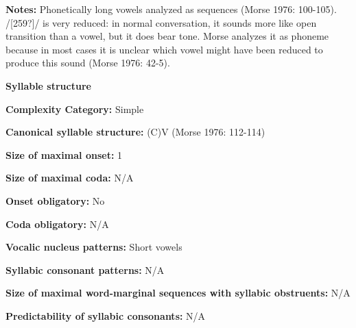 \begin{styleBody}
\textbf{Notes: }Phonetically long vowels analyzed as sequences (Morse 1976: 100-105). /[259?]/ is very reduced: in normal conversation, it sounds more like open transition than a vowel, but it does bear tone. Morse analyzes it as phoneme because in most cases it is unclear which vowel might have been reduced to produce this sound (Morse 1976: 42-5).
\end{styleBody}

\begin{styleBody}
\textbf{Syllable structure}
\end{styleBody}

\begin{styleBody}
\textbf{Complexity Category:} Simple
\end{styleBody}

\begin{styleBody}
\textbf{Canonical syllable structure:} (C)V\textbf{ }(Morse 1976: 112-114)
\end{styleBody}

\begin{styleBody}
\textbf{Size of maximal onset:} 1
\end{styleBody}

\begin{styleBody}
\textbf{Size of maximal coda:} N/A
\end{styleBody}

\begin{styleBody}
\textbf{Onset obligatory:} No
\end{styleBody}

\begin{styleBody}
\textbf{Coda obligatory:} N/A
\end{styleBody}

\begin{styleBody}
\textbf{Vocalic nucleus patterns:} Short vowels
\end{styleBody}

\begin{styleBody}
\textbf{Syllabic consonant patterns:} N/A
\end{styleBody}

\begin{styleBody}
\textbf{Size of maximal word{}-marginal sequences with syllabic obstruents:} N/A
\end{styleBody}

\begin{styleBody}
\textbf{Predictability of syllabic consonants:} N/A
\end{styleBody}

